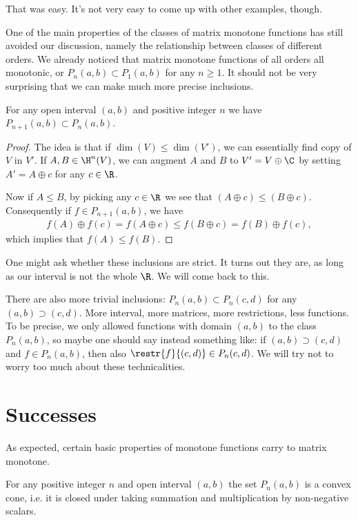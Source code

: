 That was easy. It's not very easy to come up with other examples, though.

One of the main properties of the classes of matrix monotone functions has still avoided our discussion, namely the relationship between classes of different orders. We already noticed that matrix monotone functions of all orders all monotonic, or $P_{n}(a,b) \subset P_{1}(a, b)$ for any $n \geq 1$. It should not be very surprising that we can make much more precise inclusions.

\begin{prop}
	For any open interval $(a, b)$ and positive integer $n$ we have $P_{n + 1}(a, b) \subset P_{n}(a, b)$.
\end{prop}
\begin{proof}
	The idea is that if $\dim(V) \leq \dim(V')$, we can essentially find copy of $V$ in $V'$. If $A, B \in \H^{n}(V)$, we can augment $A$ and $B$ to $V' = V \oplus \C$ by setting $A' = A \oplus c$ for any $c \in \R$.

	Now if $A \leq B$, by picking any $c \in \R$ we see that $(A \oplus c) \leq (B \oplus c)$. Consequently if $f \in P_{n + 1}(a, b)$, we have
	\begin{align*}
		f(A) \oplus f(c) = f(A \oplus c) \leq f(B \oplus c) = f(B) \oplus f(c),
	\end{align*}
	which implies that $f(A) \leq f(B)$.
\end{proof}

One might ask whether these inclusions are strict. It turns out they are, as long as our interval is not the whole $\R$. We will come back to this.

There are also more trivial inclusions: $P_{n}(a, b) \subset P_{n}(c, d)$ for any $(a, b) \supset (c, d)$. More interval, more matrices, more restrictions, less functions. To be precise, we only allowed functions with domain $(a, b)$ to the class $P_{n}(a, b)$, so maybe one should say instead something like: if $(a, b) \supset (c, d)$ and $f \in P_{n}(a, b)$, then also $\restr{f}{(c, d)} \in P_{n}(c, d)$. We will try not to worry too much about these technicalities.

\section{Successes}

As expected, certain basic properties of monotone functions carry to matrix monotone.

\begin{prop}
	For any positive integer $n$ and open interval $(a, b)$ the set $P_{n}(a, b)$ is a convex cone, i.e. it is closed under taking summation and multiplication by non-negative scalars.
\end{prop}

